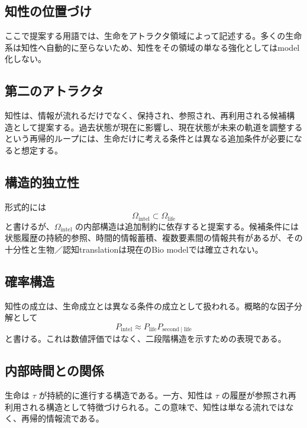 \documentclass[11pt]{ltjsarticle}
\begin{document}
\subsection{知性の位置づけ}

ここで提案する用語では、生命をアトラクタ領域によって記述する。多くの生命系は知性へ自動的に至らないため、知性をその領域の単なる強化としてはmodel化しない。

\subsection{第二のアトラクタ}

知性は、情報が流れるだけでなく、保持され、参照され、再利用される候補構造として提案する。過去状態が現在に影響し、現在状態が未来の軌道を調整するという再帰的ループには、生命だけに考える条件とは異なる追加条件が必要になると想定する。

\subsection{構造的独立性}

形式的には
\begin{equation}
  \Omega_{\mathrm{intel}}\subset\Omega_{\mathrm{life}}
\end{equation}
と書けるが、\(\Omega_{\mathrm{intel}}\) の内部構造は追加制約に依存すると提案する。候補条件には状態履歴の持続的参照、時間的情報蓄積、複数要素間の情報共有があるが、その十分性と生物／認知translationは現在のBio modelでは確立されない。

\subsection{確率構造}

知性の成立は、生命成立とは異なる条件の成立として扱われる。概略的な因子分解として
\begin{equation}
  P_{\mathrm{intel}}\approx P_{\mathrm{life}}P_{\mathrm{second}\mid\mathrm{life}}
\end{equation}
と書ける。これは数値評価ではなく、二段階構造を示すための表現である。

\subsection{内部時間との関係}

生命は \(\tau\) が持続的に進行する構造である。一方、知性は \(\tau\) の履歴が参照され再利用される構造として特徴づけられる。この意味で、知性は単なる流れではなく、再帰的情報流である。
\end{document}
